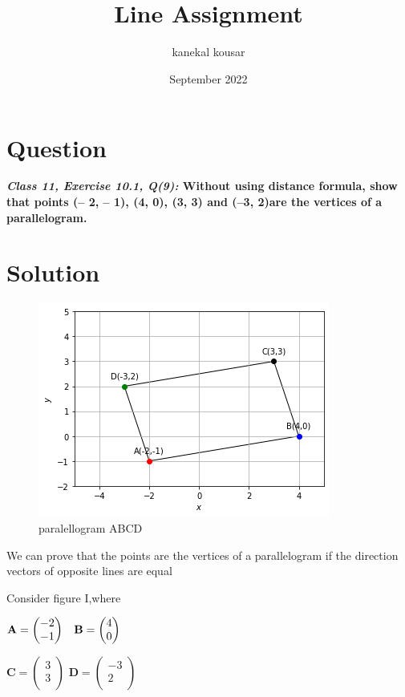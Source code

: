 \documentclass[journal,12pt,twocolumn]{IEEEtran}
\title{\textbf{\\Line Assignment}}
\author{kanekal kousar}
\date{September 2022}
\let\vec\mathbf
\begin{document}
\maketitle


\section{Question}
\textbf{\textit{Class 11, Exercise 10.1, Q(9):} Without using distance formula, show that points (– 2, – 1), (4, 0), (3, 3) and (–3, 2)are the vertices of a parallelogram.}

\section{Solution}
\raggedright 

\begin{figure}[h!]
\centering
\includegraphics[scale=0.5]{fig/paralellogram.png}  
\caption{paralellogram ABCD}
\end{figure}

\vspace{0.25cm}
We can prove that the points are the vertices of a parallelogram if the direction vectors of opposite lines are equal

Consider  figure I,where


$\vec{A}=\begin{pmatrix}-2 \\ -1 \\ \end{pmatrix}\hspace{0.3cm} \vec{B}=\begin{pmatrix} 4\\ 0 \\\end{pmatrix}$

$\vec{C}=\begin{pmatrix}3 \\ 3 \\ \end{pmatrix}$ \hspace{0.3cm} $\vec{D}=\begin{pmatrix}-3 \\ 2 \\ \end{pmatrix}$ 
\vspace{0.2cm}
\end{document}
